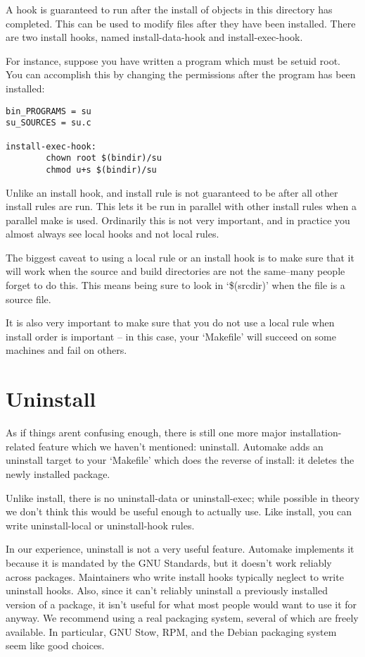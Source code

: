 A hook is guaranteed to run after the install of objects in this directory has completed. This can be used to modify files after they have been installed. There are two install hooks, named install-data-hook and install-exec-hook.

For instance, suppose you have written a program which must be setuid root. You can accomplish this by changing the permissions after the program has been installed: 

\begin{Verbatim}[frame=single]
bin_PROGRAMS = su
su_SOURCES = su.c

install-exec-hook:
        chown root $(bindir)/su
        chmod u+s $(bindir)/su
\end{Verbatim}

Unlike an install hook, and install rule is not guaranteed to be after all other install rules are run. This lets it be run in parallel with other install rules when a parallel make is used. Ordinarily this is not very important, and in practice you almost always see local hooks and not local rules.

The biggest caveat to using a local rule or an install hook is to make 
sure that it will work when the source and build directories are not 
the same--many people forget to do this. This means being sure to look 
in `\$(srcdir)' when the file is a source file.

It is also very important to make sure that you do not use a local rule when install order is important -- in this case, your `Makefile' will succeed on some machines and fail on others. 

\section{Uninstall}

As if things arent confusing enough, there is still one more major installation-related feature which we haven't mentioned: uninstall. Automake adds an uninstall target to your `Makefile' which does the reverse of install: it deletes the newly installed package.

Unlike install, there is no uninstall-data or uninstall-exec; while possible in theory we don't think this would be useful enough to actually use. Like install, you can write uninstall-local or uninstall-hook rules.

In our experience, uninstall is not a very useful feature. Automake implements it because it is mandated by the GNU Standards, but it doesn't work reliably across packages. Maintainers who write install hooks typically neglect to write uninstall hooks. Also, since it can't reliably uninstall a previously installed version of a package, it isn't useful for what most people would want to use it for anyway. We recommend using a real packaging system, several of which are freely available. In particular, GNU Stow, RPM, and the Debian packaging system seem like good choices. 

